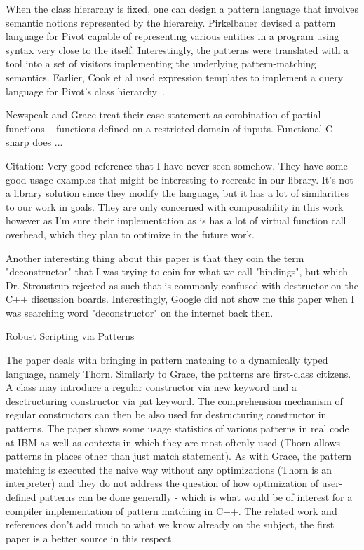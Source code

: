 When the class hierarchy is fixed, one can design a pattern language that involves 
semantic notions represented by the hierarchy. Pirkelbauer devised a pattern 
language for Pivot capable of representing various entities in a \Cpp{} program using syntax very close to the \Cpp{} itself. 
Interestingly, the patterns were translated with a tool into a set of visitors 
implementing the underlying pattern-matching semantics\cite{PirkelbauerThesis}. 
Earlier, Cook et al used expression templates to implement a query language for 
Pivot's class hierarchy~\cite{iql04}. %

Newspeak and Grace treat their case statement as combination of partial 
functions -- functions defined on a restricted domain of inputs. Functional C 
sharp does ...

Citation\cite{padl08}:
Very good reference that I have never seen somehow. They have some good usage 
examples that might be interesting to recreate in our library. It's not a 
library solution since they modify the language, but it has a lot of 
similarities to our work in goals. They are only concerned with composability in 
this work however as I'm sure their implementation as is has a lot of virtual 
function call overhead, which they plan to optimize in the future work.  

Another interesting thing about this paper is that they coin the term 
"deconstructor" that I was trying to coin for what we call "bindings", but which 
Dr. Stroustrup rejected as such that is commonly confused with destructor on the 
C++ discussion boards. Interestingly, Google did not show me this paper when I 
was searching word "deconstructor" on the internet back then. 

Robust Scripting via Patterns~\cite{Thorn2012}
 
The paper deals with bringing in pattern matching to a dynamically typed 
language, namely Thorn. Similarly to Grace, the patterns are first-class 
citizens. A class may introduce a regular constructor via new keyword and a 
desctructuring constructor via pat keyword. The comprehension mechanism of 
regular constructors can then be also used for destructuring constructor in 
patterns. The paper shows some usage statistics of various patterns in real code 
at IBM as well as contexts in which they are most oftenly used (Thorn allows 
patterns in places other than just match statement). As with Grace, the pattern 
matching is executed the naive way without any optimizations (Thorn is an 
interpreter) and they do not address the question of how optimization of 
user-defined patterns can be done generally - which is what would be of interest 
for a compiler implementation of pattern matching in C++. The related work and 
references don't add much to what we know already on the subject, the first 
paper is a better source in this respect. 

